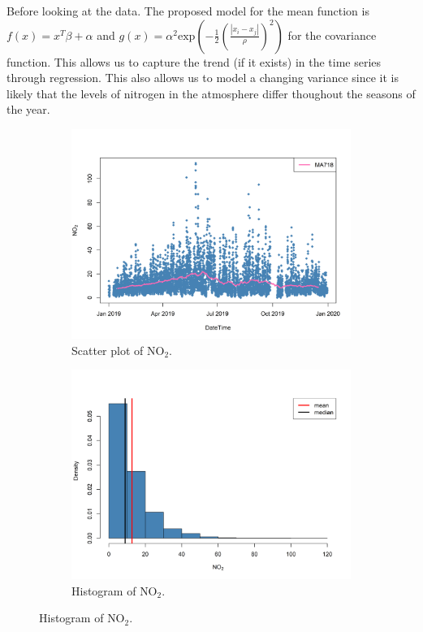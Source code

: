 \documentclass[a4paper, 10pt]{article}
\begin{document}
\begin{flushleft}
      \vspace{1em}

      Before looking at the data. The proposed model for the mean function is $f(x) = x^{T} \beta + \alpha$ and $g(x) = \alpha^{2} \text{exp}(- \frac{1}{2} (\frac{|x_i - x_j|}{\rho})^2)$ for the covariance function. This allows us to capture the trend (if it exists) in the time series through regression. This also allows us to model a changing variance since it is likely that the levels of nitrogen in the atmosphere differ thoughout the seasons of the year.
      
      \begin{figure}[H]
         \centering
         \begin{subfigure}[t]{0.48\linewidth}
            \centering
            \includegraphics[width=\linewidth]{../images/no2_scatter_2019.png}
            \caption{Scatter plot of $\text{NO}_{2}$.}
         \end{subfigure}
         \hfill
         \begin{subfigure}[t]{0.48\linewidth}
            \centering
            \includegraphics[width=\linewidth]{../images/no2_hist_2019.png}
            \caption{Histogram of $\text{NO}_{2}$.}
         \end{subfigure}
      \end{figure}


\end{flushleft}
\end{document}

